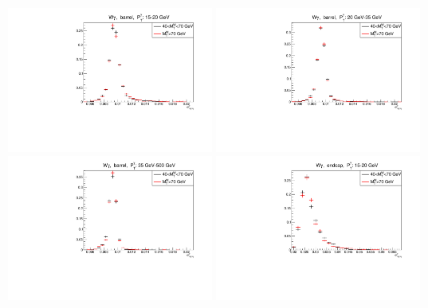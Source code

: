 \begin{figure}[htb]
  \begin{center}
  \includegraphics[width=0.48\textwidth]{../figs/figs_v11/MUON_WGamma/QuickChecks/cTemplatesVsWMt_Wg_phoSigmaIEtaIEta_BARREL_pt15to20.pdf} \includegraphics[width=0.48\textwidth]{../figs/figs_v11/MUON_WGamma/QuickChecks/cTemplatesVsWMt_Wg_phoSigmaIEtaIEta_BARREL_pt20to35.pdf} \\
  \includegraphics[width=0.48\textwidth]{../figs/figs_v11/MUON_WGamma/QuickChecks/cTemplatesVsWMt_Wg_phoSigmaIEtaIEta_BARREL_pt35to500.pdf}  \includegraphics[width=0.48\textwidth]{../figs/figs_v11/MUON_WGamma/QuickChecks/cTemplatesVsWMt_Wg_phoSigmaIEtaIEta_ENDCAP_pt15to20.pdf} \\

\end{center}
\end{figure}
